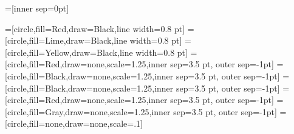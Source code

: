 

\usepackage[svgnames]{xcolor}
\usepackage{tikz}
\usetikzlibrary{decorations.markings}
\usetikzlibrary{shapes.geometric}

\newcommand\scaledLW{0.5} %

\newcommand\scaledNodeSize{0.5} %

\newcommand\nodescale{1.25} %


=[inner sep=0pt]




=[circle,fill=Red,draw=Black,line width=0.8 pt]
=[circle,fill=Lime,draw=Black,line width=0.8 pt]
=[circle,fill=Yellow,draw=Black,line width=0.8 pt]
=[circle,fill=Red,draw=none,scale=\nodescale,inner sep=3.5 pt, outer sep=-1pt]
=[circle,fill=Black,draw=none,scale=\nodescale,inner sep=3.5 pt, outer sep=-1pt]
=[circle,fill=Black,draw=none,scale=\nodescale,inner sep=3.5 pt, outer sep=-1pt]
=[circle,fill=Red,draw=none,scale=\nodescale,inner sep=3.5 pt, outer sep=-1pt]
=[circle,fill=Gray,draw=none,scale=\nodescale,inner sep=3.5 pt, outer sep=-1pt]
=[circle,fill=none,draw=none,scale=.1]




